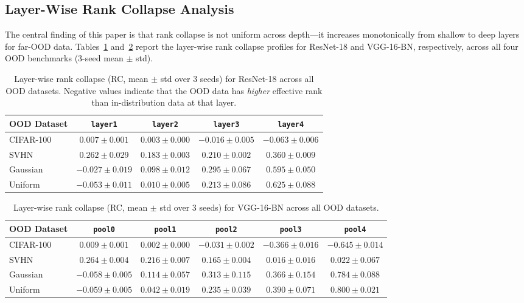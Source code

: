 \documentclass{article}
\begin{document}
\subsection{Layer-Wise Rank Collapse Analysis}
\label{sec:layerwise}

The central finding of this paper is that rank collapse is not uniform across depth---it increases monotonically from shallow to deep layers for far-OOD data. Tables~\ref{tab:layerwise} and~\ref{tab:layerwise_vgg} report the layer-wise rank collapse profiles for ResNet-18 and VGG-16-BN, respectively, across all four OOD benchmarks (3-seed mean $\pm$ std).

\begin{table}[h]
\centering
\caption{Layer-wise rank collapse (RC, mean $\pm$ std over 3 seeds) for ResNet-18 across all OOD datasets. Negative values indicate that the OOD data has \emph{higher} effective rank than in-distribution data at that layer.}
\label{tab:layerwise}
\small
\begin{tabular}{@{}lcccc@{}}
\toprule
OOD Dataset & \texttt{layer1} & \texttt{layer2} & \texttt{layer3} & \texttt{layer4} \\
\midrule
CIFAR-100 & $0.007 \pm 0.001$ & $0.003 \pm 0.000$ & $-0.016 \pm 0.005$ & $-0.063 \pm 0.006$ \\
SVHN & $0.262 \pm 0.029$ & $0.183 \pm 0.003$ & $0.210 \pm 0.002$ & $0.360 \pm 0.009$ \\
Gaussian & $-0.027 \pm 0.019$ & $0.098 \pm 0.012$ & $0.295 \pm 0.067$ & $0.595 \pm 0.050$ \\
Uniform & $-0.053 \pm 0.011$ & $0.010 \pm 0.005$ & $0.213 \pm 0.086$ & $0.625 \pm 0.088$ \\
\bottomrule
\end{tabular}
\end{table}

\begin{table}[h]
\centering
\caption{Layer-wise rank collapse (RC, mean $\pm$ std over 3 seeds) for VGG-16-BN across all OOD datasets.}
\label{tab:layerwise_vgg}
\small
\begin{tabular}{@{}lccccc@{}}
\toprule
OOD Dataset & \texttt{pool0} & \texttt{pool1} & \texttt{pool2} & \texttt{pool3} & \texttt{pool4} \\
\midrule
CIFAR-100 & $0.009 \pm 0.001$ & $0.002 \pm 0.000$ & $-0.031 \pm 0.002$ & $-0.366 \pm 0.016$ & $-0.645 \pm 0.014$ \\
SVHN & $0.264 \pm 0.004$ & $0.216 \pm 0.007$ & $0.165 \pm 0.004$ & $0.016 \pm 0.016$ & $0.022 \pm 0.067$ \\
Gaussian & $-0.058 \pm 0.005$ & $0.114 \pm 0.057$ & $0.313 \pm 0.115$ & $0.366 \pm 0.154$ & $0.784 \pm 0.088$ \\
Uniform & $-0.059 \pm 0.005$ & $0.042 \pm 0.019$ & $0.235 \pm 0.039$ & $0.390 \pm 0.071$ & $0.800 \pm 0.021$ \\
\bottomrule
\end{tabular}
\end{table}
\end{document}
